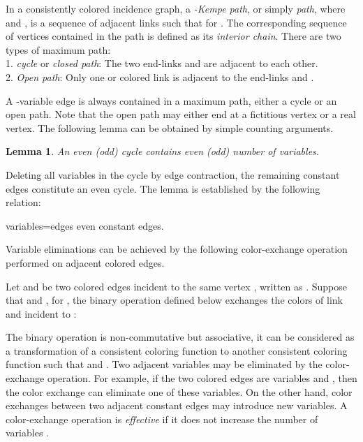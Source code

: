 \documentclass[11pt]{article}
\newtheorem{lemma}[theorem]{Lemma}
\newenvironment{proof}[1][Proof]{\begin{trivlist}
\item[\hskip \labelsep {\bfseries #1}]}{\end{trivlist}}
\newenvironment{definition}[1][Definition]{\begin{trivlist}
\item[\hskip \labelsep {\bfseries #1}]}{\end{trivlist}}
\newcommand{\qed}{\nobreak \ifvmode \relax \else
      \ifdim\lastskip<1.5em \hskip-\lastskip
      \hskip1.5em plus0em minus0.5em \fi \nobreak
      \vrule height0.75em width0.5em depth0.25em\fi}
\begin{document}
\begin{definition}
\label{definition:KempePath}
In a consistently colored incidence graph, a {\it -Kempe path}, or simply {\it  path}, where  and , is a sequence of adjacent links  such that  for . The corresponding sequence of vertices contained in the path is defined as its {\it interior chain}. There are two types of maximum  path:\\
1. {\it  cycle} or {\it closed  path}: The two end-links  and  are adjacent to each other.\\
2. {\it Open  path}: Only one  or  colored link is adjacent to the end-links   and .
\end{definition}


A -variable edge is always contained in a maximum  path, either a  cycle or an open  path. Note that the open path may either end at a fictitious vertex or a real vertex. The following lemma can be obtained by simple counting arguments.

\begin{lemma}
\label{lemma:oddeven}
An even (odd)  cycle contains even (odd) number of  variables. 
\end{lemma}
\begin{proof}
Deleting all variables  in the  cycle by edge contraction, the remaining constant edges constitute an even  cycle. The lemma is established by the following relation:
\begin{center}
 variables=edges  even constant edges. \qed
\end{center}
\end{proof}

Variable eliminations can be achieved by the following color-exchange operation performed on adjacent colored edges.

\begin{definition}
\label{definition:colorexchange}
Let    and  be two colored edges incident to the same vertex , written as . Suppose that  and , for , the binary operation  defined below exchanges the colors of link  and  incident to :

\end{definition}

The binary operation  is non-commutative but associative, it can be considered as a transformation of a consistent coloring function  to another consistent coloring function  such that  and . Two adjacent variables may be eliminated by the color-exchange operation. For example, if the two colored edges are variables  and , then the color exchange  can eliminate one of these variables. On the other hand, color exchanges between two adjacent constant edges may introduce new variables. A color-exchange operation is {\it effective} if it does not increase the number of variables .
\end{document}
